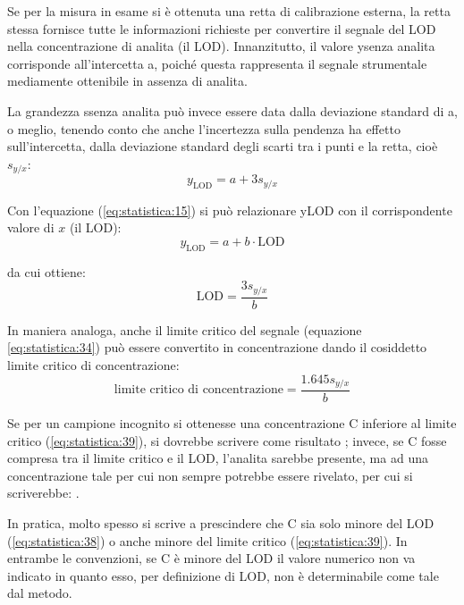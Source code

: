 Se per la misura in esame si è ottenuta una retta di calibrazione esterna, la retta stessa fornisce tutte le informazioni richieste per convertire il segnale del LOD nella concentrazione di analita (il LOD). Innanzitutto, il valore ysenza analita corrisponde all'intercetta a, poiché questa rappresenta il segnale strumentale mediamente ottenibile in assenza di analita.

La grandezza ssenza analita può invece essere data dalla deviazione standard di a, o meglio, tenendo conto che anche l'incertezza sulla pendenza ha effetto sull'intercetta, dalla deviazione standard degli scarti tra i punti e la retta, cioè $s_{y/x}$:
\begin{equation} \label{eq:statistica:36}
y_{\mathrm{LOD}} = a + 3 s_{y/x}
\end{equation}

Con l'equazione (\ref{eq:statistica:15}) si può relazionare yLOD con il corrispondente valore di $x$ (il LOD):
\begin{equation} \label{eq:statistica:37}
y_{\mathrm{LOD}} = a + b \cdot \mathrm{LOD}
\end{equation}

da cui ottiene:
\begin{equation} \label{eq:statistica:38}
\mathrm{LOD} = \frac{3 s_{y/x}}{b}
\end{equation}

In maniera analoga, anche il limite critico del segnale (equazione \ref{eq:statistica:34}) può essere convertito in concentrazione dando il cosiddetto limite critico di concentrazione:
\begin{equation} \label{eq:statistica:39}
\text{limite critico di concentrazione} = \frac{1.645 s_{y/x}}{b}
\end{equation}

Se per un campione incognito si ottenesse una concentrazione C inferiore al limite critico (\ref{eq:statistica:39}), si dovrebbe scrivere come risultato ; invece, se C fosse compresa tra il limite critico e il LOD, l'analita sarebbe presente, ma ad una concentrazione tale per cui non sempre potrebbe essere rivelato, per cui si scriverebbe: .

In pratica, molto spesso si scrive  a prescindere che C sia solo minore del LOD (\ref{eq:statistica:38}) o anche minore del limite critico (\ref{eq:statistica:39}). In entrambe le convenzioni, se C è minore del LOD il valore numerico non va indicato in quanto esso, per definizione di LOD, non è determinabile come tale dal metodo.


